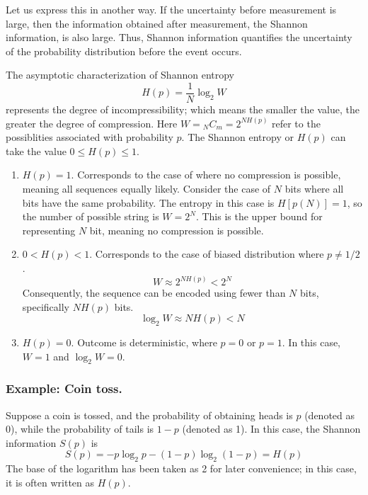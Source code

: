 \documentclass[../../../main.tex]{subfiles}
\begin{document}
Let us express this in another way.
If the uncertainty before measurement is large, then the information obtained after measurement, the Shannon information, is also large.
Thus, Shannon information quantifies the uncertainty of the probability distribution before the event occurs.

The asymptotic characterization of Shannon entropy
\begin{equation*}
  H(p) = \frac{1 }{N }\log_2 W
\end{equation*}
represents the degree of incompressibility; which means the smaller the value, the greater the degree of compression.
Here $W= {}_N C_m = 2^{NH(p)}$ refer to the possiblities associated with probability $p$.
The Shannon entropy or $H(p)$ can take the value $0\leq H(p) \leq 1$.
\begin{enumerate}
  \item $H(p)=1$.
        Corresponds to the case of where no compression is possible, meaning all sequences equally likely.
        Consider the case of $N$ bits where all bits have the same probability.
        The entropy in this case is $H[p(N)]=1$, so the number of possible string is $W=2^N$.
        This is the upper bound for representing $N$ bit, meaning no compression is possible.
  \item $0<H(p)<1$.
        Corresponds to the case of biased distribution where $p \neq 1/2$.
        \begin{equation*}
          W \approx 2^{N H(p)} < 2^{N}
        \end{equation*}
        Consequently, the sequence can be encoded using fewer than $N$ bits, specifically $NH(p)$ bits.
        \begin{equation*}
          \log_2 W \approx N H(p) < N
        \end{equation*}
  \item $H(p)=0$.
        Outcome is deterministic, where $p=0$ or $p=1$.
        In this case, $W=1$ and $\log_2 W=0$.
\end{enumerate}

\subsubsection{Example: Coin toss.}
Suppose a coin is tossed, and the probability of obtaining heads is \( p \) (denoted as 0), while the probability of tails is \( 1-p \) (denoted as 1). In this case, the Shannon information \( S(p) \) is
\begin{equation*}
  S(p)
  = -p \log_2 p - (1 - p)\log_2 (1 - p)
  = H(p)
\end{equation*}
The base of the logarithm has been taken as 2 for later convenience; in this case, it is often written as \( H(p) \).
\end{document}
